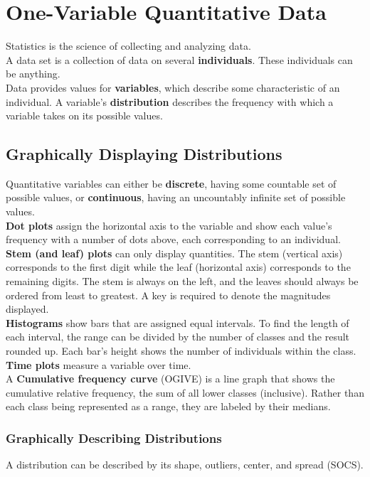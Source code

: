 \documentclass[../AP_Statistics.tex]{subfiles}
\begin{document}
	\chapter{One-Variable Quantitative Data}
		Statistics is the science of collecting and analyzing data. \\
		A data set is a collection of data on several \textbf{individuals}. These individuals can be anything. \\
		Data provides values for \textbf{variables}, which describe some characteristic of an individual.
		A variable's \textbf{distribution} describes the frequency with which a variable takes on its possible values.
		\section{Graphically Displaying Distributions}
			Quantitative variables can either be \textbf{discrete}, having some countable set of possible values, or \textbf{continuous}, having an uncountably infinite set of possible values. \\
			\textbf{Dot plots} assign the horizontal axis to the variable and show each value's frequency with a number of dots above, each corresponding to an individual. \\
			\textbf{Stem (and leaf) plots} can only display quantities. The stem (vertical axis) corresponds to the first digit while the leaf (horizontal axis) corresponds to the remaining digits. The stem is always on the left, and the leaves should always be ordered from least to greatest. A key is required to denote the magnitudes displayed. \\
			\textbf{Histograms} show bars that are assigned equal intervals. To find the length of each interval, the range can be divided by the number of classes and the result rounded up. Each bar's height shows the number of individuals within the class. \\
			\textbf{Time plots} measure a variable over time. \\
			A \textbf{Cumulative frequency curve} (OGIVE) is a line graph that shows the cumulative relative frequency, the sum of all lower classes (inclusive). Rather than each class being represented as a range, they are labeled by their medians.
			\subsection*{Graphically Describing Distributions}
				A distribution can be described by its shape, outliers, center, and spread (SOCS).
\end{document}
